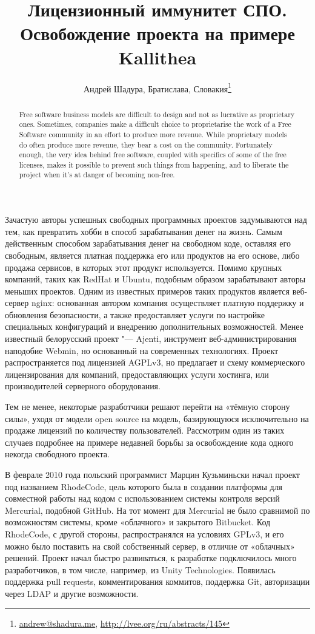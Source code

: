 \documentclass[10pt, a5paper]{article}
\begin{document}
\title{Лицензионный иммунитет СПО. Освобождение проекта на примере Kallithea}
\author{Андрей Шадура, Братислава, Словакия\footnote{\url{andrew@shadura.me}, \url{http://lvee.org/ru/abstracts/145}}}
\maketitle
\begin{abstract}
Free software business models are difficult to design and not as lucrative as proprietary ones. Sometimes, companies make a difficult                choice to proprietarise the work of a Free Software community in an effort to produce more revenue. While proprietary models do often produce more revenue, they bear a cost on the community. Fortunately enough, the very idea behind free software, coupled with specifics of some of the free licenses, makes it possible to prevent such things from happening, and to liberate the project when it's at danger of becoming non-free.
\end{abstract}
Зачастую авторы успешных свободных программных проектов задумываются над тем, как превратить хобби в способ зарабатывания денег на жизнь. Самым действенным способом зарабатывания денег на свободном коде, оставляя его свободным, является платная поддержка его или продуктов на его основе, либо продажа сервисов, в которых этот продукт используется. Помимо крупных компаний, таких как RedHat и Ubuntu, подобным образом зарабатывают авторы меньших проектов. Одним из известных примеров таких продуктов является веб-сервер nginx: основанная автором компания осуществляет платную поддержку и обновления безопасности, а также предоставляет услуги по настройке специальных конфигураций и внедрению дополнительных возможностей. Менее известный белорусский проект "--- Ajenti, инструмент веб-администрирования наподобие Webmin, но основанный на современных технологиях. Проект распространяется под лицензией AGPLv3, но предлагает и схему коммерческого лицензирования для компаний, предоставляющих услуги хостинга, или производителей серверного оборудования.

Тем не менее, некоторые разработчики решают перейти на «тёмную сторону силы», уходя от модели open source на модель, базирующуюся исключительно на продаже лицензий по количеству пользователей. Рассмотрим один из таких случаев подробнее на примере недавней борьбы за освобождение кода одного некогда свободного проекта.

В феврале 2010 года польский программист Марцин Кузьминьски начал проект под названием RhodeCode, цель которого была в создании платформы для совместной работы над кодом с использованием системы контроля версий Mercurial, подобной GitHub. На тот момент для Mercurial не было сравнимой по возможностям системы, кроме «облачного» и закрытого Bitbucket. Код RhodeCode, с другой стороны, распространялся на условиях GPLv3, и его можно было поставить на свой собственный сервер, в отличие от «облачных» решений. Проект начал быстро развиваться, к разработке подключилось много разработчиков, в том числе, например, из Unity Technologies. Появилась поддержка pull requests, комментирования коммитов, поддержка Git, авторизации через LDAP и другие возможности.
\end{document}
